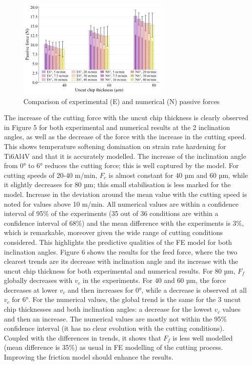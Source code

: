 \documentclass[final,5p,times,twocolumn]{elsarticle}
\begin{document}
\begin{figure}[h]
\centering
\includegraphics{Figures/Fp}
\caption{Comparison of experimental (E) and numerical (N) passive forces}
\label{Fp}
\end{figure}

The increase of the cutting force with the uncut chip thickness is clearly observed in Figure 5 for both experimental and numerical results at the 2 inclination angles, as well as the decrease of the force with the increase in the cutting speed. This shows temperature softening domination on strain rate hardening for Ti6Al4V and that it is accurately modelled. The increase of the inclination angle from 0° to 6° reduces the cutting force; this is well captured by the model. For cutting speeds of 20-40 m/min, $F_c$ is almost constant for 40 µm and 60 µm, while it slightly decreases for 80 µm; this small stabilisation is less marked for the model.
Increase in the deviation around the mean value with the cutting speed is noted for values above 10 m/min. All numerical values are within a confidence interval of 95\% of the experiments (35 out of 36 conditions are within a confidence interval of 68\%) and the mean difference with the experiments is 3\%, which is remarkable, moreover given the wide range of cutting conditions considered. This highlights the predictive qualities of the FE model for both inclination angles.
Figure 6 shows the results for the feed force, where the two clearest trends are its decrease with inclination angle and its increase with the uncut chip thickness for both experimental and numerical results. For 80 µm, $F_f$ globally decreases with $v_c$ in the experiments. For 40 and 60 µm, the force decreases at lower $v_c$ and then increases for 0°, while a decrease is observed at all $v_c$ for 6°. For the numerical values, the global trend is the same for the 3 uncut chip thicknesses and both inclination angles: a decrease for the lowest $v_c$ values and then an increase. The numerical values are mostly not within the 95\% confidence interval (it has no clear evolution with the cutting conditions). Coupled with the differences in trends, it shows that $F_f$ is less well modelled (mean difference is 35\%) as usual in FE modelling of the cutting process. Improving the friction model should enhance the results.
\end{document}
